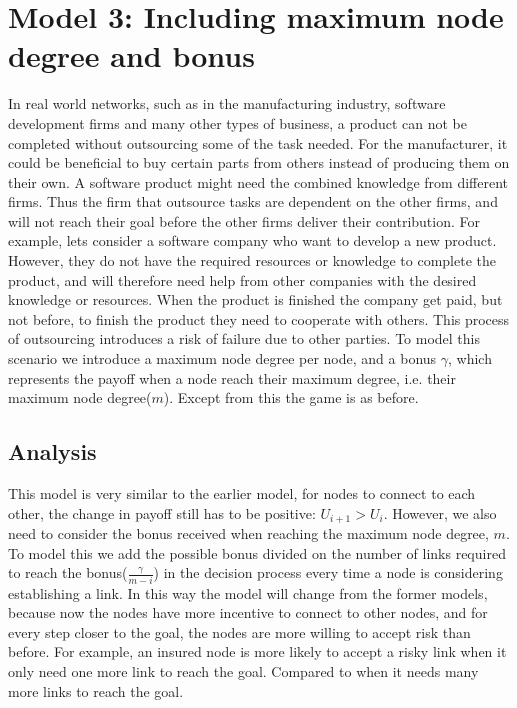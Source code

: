

\section{Model 3: Including maximum node degree and bonus}
In real world networks, such as in the manufacturing industry, software development firms and many other types of business, a product can not be completed without outsourcing some of the task needed. For the manufacturer, it could be beneficial to buy certain parts from others instead of producing them on their own. A software product might need the combined knowledge from different firms. Thus the firm that outsource tasks are dependent on the other firms, and will not reach their goal before the other firms deliver their contribution. 
For example, lets consider a software company who want to develop a new product. However, they do not have the required resources or knowledge to complete the product, and will therefore need help from other companies with the desired knowledge or resources. When the product is finished the company get paid, but not before, to finish the product they need to cooperate with others.
This process of outsourcing introduces a risk of failure due to other parties. To model this scenario we introduce a maximum node degree per node, and a bonus $\gamma$, which represents the payoff when a node reach their maximum degree, i.e. their maximum node degree($m$).
Except from this the game is as before.
\subsection{Analysis}
This model is very similar to the earlier model, for nodes to connect to each other, the change in payoff still has to be positive: $U_{i+1} > U_{i}$. However, we also need to consider the bonus received when reaching the maximum node degree, $m$. 
To model this we add the possible bonus divided on the number of links required to reach the bonus($\frac{\gamma}{m-i}$) in the decision process every time a node is considering establishing a link. 
In this way the model will change from the former models, because now the nodes have more incentive to connect to other nodes, and for every step closer to the goal, the nodes are more willing to accept risk than before. For example, an insured node is more likely to accept a risky link when it only need one more link to reach the goal. Compared to when it needs many more links to reach the goal.

